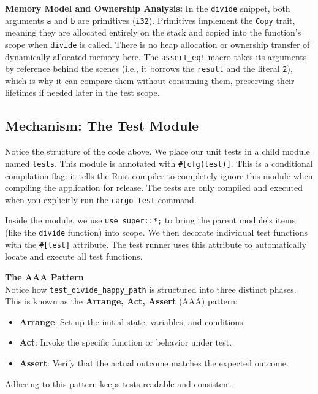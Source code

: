 \textbf{Memory Model and Ownership Analysis:} In the \texttt{divide} snippet, both arguments \texttt{a} and \texttt{b} are primitives (\texttt{i32}). Primitives implement the \texttt{Copy} trait, meaning they are allocated entirely on the stack and copied into the function's scope when \texttt{divide} is called. There is no heap allocation or ownership transfer of dynamically allocated memory here. The \texttt{assert\_eq!} macro takes its arguments by reference behind the scenes (i.e., it borrows the \texttt{result} and the literal \texttt{2}), which is why it can compare them without consuming them, preserving their lifetimes if needed later in the test scope.

\subsection{Mechanism: The Test Module}
Notice the structure of the code above. We place our unit tests in a child module named \texttt{tests}. This module is annotated with \texttt{\#[cfg(test)]}. This is a conditional compilation flag: it tells the Rust compiler to completely ignore this module when compiling the application for release. The tests are only compiled and executed when you explicitly run the \texttt{cargo test} command.

Inside the module, we use \texttt{use super::*;} to bring the parent module's items (like the \texttt{divide} function) into scope. We then decorate individual test functions with the \texttt{\#[test]} attribute. The test runner uses this attribute to automatically locate and execute all test functions.

\begin{notebox}
\textbf{The AAA Pattern}\\
Notice how \texttt{test\_divide\_happy\_path} is structured into three distinct phases. This is known as the \textbf{Arrange, Act, Assert} (AAA) pattern:
\begin{itemize}
    \item \textbf{Arrange}: Set up the initial state, variables, and conditions.
    \item \textbf{Act}: Invoke the specific function or behavior under test.
    \item \textbf{Assert}: Verify that the actual outcome matches the expected outcome.
\end{itemize}
Adhering to this pattern keeps tests readable and consistent.
\end{notebox}

